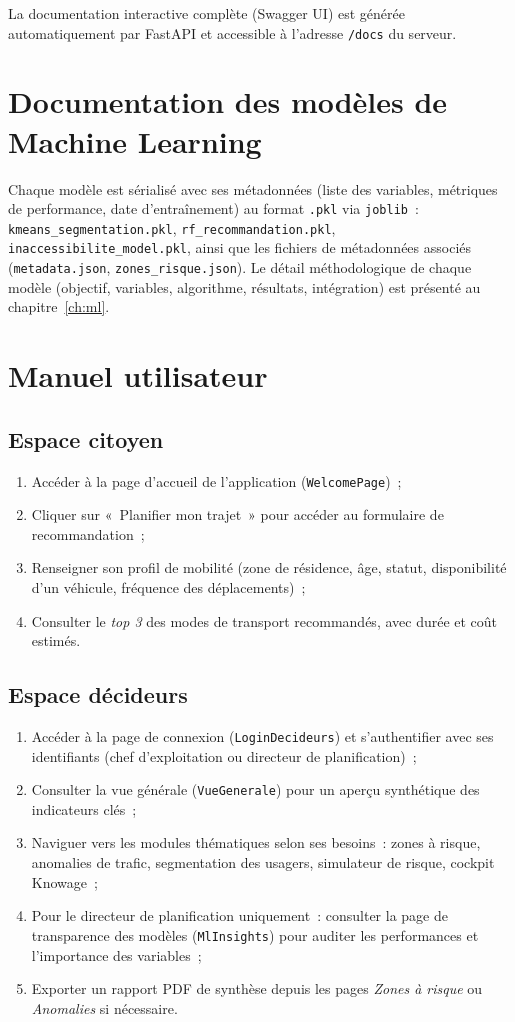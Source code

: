 La documentation interactive complète (Swagger UI) est générée automatiquement par FastAPI et accessible à l'adresse \texttt{/docs} du serveur.

\section{Documentation des modèles de Machine Learning}
Chaque modèle est sérialisé avec ses métadonnées (liste des variables, métriques de performance, date d'entraînement) au format \texttt{.pkl} via \texttt{joblib}~: \texttt{kmeans\_segmentation.pkl}, \texttt{rf\_recommandation.pkl}, \texttt{inaccessibilite\_model.pkl}, ainsi que les fichiers de métadonnées associés (\texttt{metadata.json}, \texttt{zones\_risque.json}). Le détail méthodologique de chaque modèle (objectif, variables, algorithme, résultats, intégration) est présenté au chapitre~\ref{ch:ml}.

\section{Manuel utilisateur}

\subsection{Espace citoyen}
\begin{enumerate}
\item Accéder à la page d'accueil de l'application (\texttt{WelcomePage})~;
\item Cliquer sur «~Planifier mon trajet~» pour accéder au formulaire de recommandation~;
\item Renseigner son profil de mobilité (zone de résidence, âge, statut, disponibilité d'un véhicule, fréquence des déplacements)~;
\item Consulter le \emph{top 3} des modes de transport recommandés, avec durée et coût estimés.
\end{enumerate}

\subsection{Espace décideurs}
\begin{enumerate}
\item Accéder à la page de connexion (\texttt{LoginDecideurs}) et s'authentifier avec ses identifiants (chef d'exploitation ou directeur de planification)~;
\item Consulter la vue générale (\texttt{VueGenerale}) pour un aperçu synthétique des indicateurs clés~;
\item Naviguer vers les modules thématiques selon ses besoins~: zones à risque, anomalies de trafic, segmentation des usagers, simulateur de risque, cockpit Knowage~;
\item Pour le directeur de planification uniquement~: consulter la page de transparence des modèles (\texttt{MlInsights}) pour auditer les performances et l'importance des variables~;
\item Exporter un rapport PDF de synthèse depuis les pages \emph{Zones à risque} ou \emph{Anomalies} si nécessaire.
\end{enumerate}

